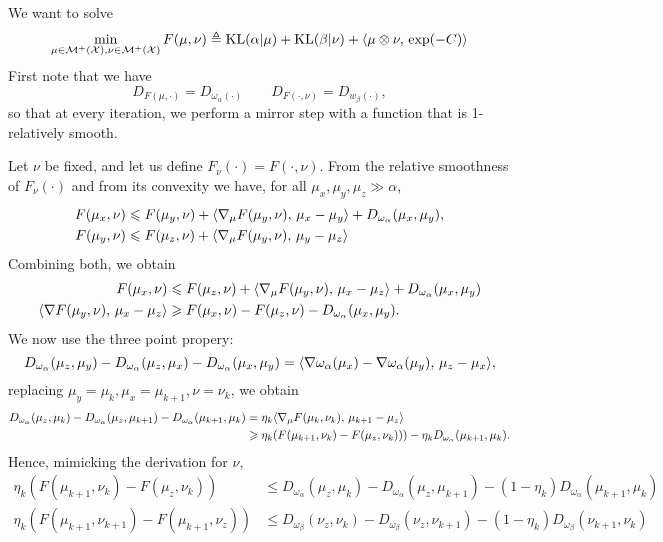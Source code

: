 \documentclass[a4paper, 10pt]{article}
\begin{document}
We want to solve
\begin{equation}
    \min_{\mu \in \mathcal{M}^+(\mathcal{X}), \nu \in \mathcal{M}^+(\mathcal{X})} 
    F(\mu, \nu) \triangleq \text{KL}(\alpha | \mu) + \text{KL}(\beta | \nu) + \langle \mu \otimes \nu,\,\exp(-C)\rangle
\end{equation}
First note that we have
\begin{equation}
    D_{F(\mu, \cdot)} = D_{\omega_\alpha(\cdot)}\qquad D_{F(\cdot, \nu)} = D_{w_\beta(\cdot)},
\end{equation}
so that at every iteration, we perform a mirror step with a function that is 1-relatively smooth.

Let $\nu$ be fixed, and let us define $F_\nu(\cdot) = F(\cdot, \nu)$. From the relative
smoothness of $F_\nu(\cdot)$ and from its convexity we have, for all 
$\mu_x, \mu_y, \mu_z \gg \alpha$,
\begin{align}
    F(\mu_x, \nu) &\leqslant F(\mu_y, \nu)
     + \langle \nabla_\mu F(\mu_y, \nu),\,\mu_x- \mu_y\rangle + D_{\omega_\alpha}(\mu_x, \mu_y), \\
    F(\mu_y, \nu) &\leqslant F(\mu_z, \nu) + \langle \nabla_\mu F(\mu_y, \nu),\,\mu_y - \mu_z\rangle
\end{align}
Combining both, we obtain
\begin{align}
    F(\mu_x, \nu) &\leqslant F(\mu_z, \nu) + 
    \langle \nabla_\mu F(\mu_y, \nu),\,\mu_x - \mu_z\rangle + D_{\omega_\alpha}(\mu_x, \mu_y) \\
    \langle \nabla F(\mu_y, \nu),\,\mu_x - \mu_z\rangle 
    &\geqslant F(\mu_x, \nu) - F(\mu_z, \nu) - D_{\omega_\alpha}(\mu_x, \mu_y).
\end{align}
We now use the three point propery:
\begin{equation}
    D_{\omega_\alpha}(\mu_z, \mu_y) - D_{\omega_\alpha}(\mu_z, \mu_x) 
    - D_{\omega_\alpha}(\mu_x, \mu_y) 
    = \langle \nabla \omega_\alpha(\mu_x) - \nabla \omega_\alpha(\mu_y),\,\mu_z - \mu_x\rangle,
\end{equation}
replacing $\mu_y = \mu_{k}, \mu_x = \mu_{k+1}, \nu = \nu_k$, we obtain
\begin{align}
    D_{\omega_\alpha}(\mu_z, \mu_k) - D_{\omega_\alpha}(\mu_z, \mu_{k+1}) 
    - D_{\omega_\alpha}(\mu_{k+1}, \mu_k) &=
     \eta_k \langle \nabla_\mu F(\mu_k, \nu_k),\,\mu_{k+1} - \mu_z\rangle \\
    &\geqslant \eta_k (F(\mu_{k+1}, \nu_k) - F(\mu_z, \nu_k)))
     - \eta_k D_{\omega_\alpha}   (\mu_{k+1},\mu_k).
\end{align}
Hence, mimicking the derivation for $\nu$,
\begin{align}\label{eq:mirror_ineq}
    \eta_k (F(\mu_{k+1},\nu_k) - F(\mu_z, \nu_k)) &\leq 
    D_{\omega_\alpha}(\mu_z, \mu_k) - D_{\omega_\alpha}(\mu_z, \mu_{k+1}) 
    - (1 - \eta_k) D_{\omega_\alpha}(\mu_{k+1}, \mu_k) \\
    \eta_k (F(\mu_{k+1},\nu_{k+1}) - F(\mu_{k+1}, \nu_z)) &\leq 
    D_{\omega_\beta}(\nu_z, \nu_k) - D_{\omega_\beta}(\nu_z, \nu_{k+1}) 
    - (1 - \eta_k) D_{\omega_\beta}(\nu_{k+1}, \nu_k)
\end{align}
\end{document}
